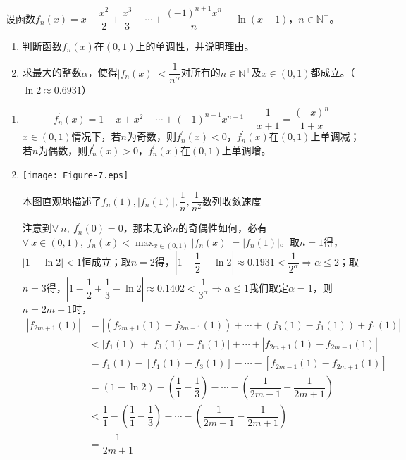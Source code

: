 \begin{que}
	设函数$f_n(x)=x-\dfrac{x^2}{2}+\dfrac{x^3}{3}-\cdots+\dfrac{(-1)^{n+1}x^n}{n}-\ln(x+1)$，$n\in\mathbb{N}^+$。
	\begin{enumerate}
		\item 判断函数$f_n(x)$在$(0,1)$上的单调性，并说明理由。
		\item 求最大的整数$\alpha$，使得$|f_n(x)|<\dfrac{1}{n^\alpha}$对所有的$n\in\mathbb{N}^+$及$x\in(0,1)$都成立。（$\ln 2\approx 0.6931$）
	\end{enumerate}
\end{que}
\sol{} \begin{enumerate}
	\item $$f_n^\prime(x)=1-x+x^2-\cdots+(-1)^{n-1}x^{n-1}-\dfrac{1}{x+1}=\dfrac{(-x)^n}{1+x}$$$x\in(0,1)$情况下，若$n$为奇数，则$f_n^\prime(x)<0$，$f_n^\prime(x)$在$(0,1)$上单调减；若$n$为偶数，则$f_n^\prime(x)>0$，$f_n^\prime(x)$在$(0,1)$上单调增。
	\item 	\begin{marginfigure}
		\texttt{[image: Figure-7.eps]}
		\caption{本图直观地描述了$f_n(1),|f_n(1)|,\dfrac{1}{n},\dfrac{1}{n^2}$数列收敛速度}
	\end{marginfigure}注意到$\forall\ n,\ f_n^\prime(0)=0$，那末无论$n$的奇偶性如何，必有$\displaystyle\forall\ x\in(0,1),\ f_n(x)<\max_{x\in(0,1)}|f_n(x)|=|f_n(1)|$。取$n=1$得，$|1-\ln 2|<1$恒成立；取$n=2$得，$\left|1-\dfrac{1}{2}-\ln 2\right|\approx0.1931<\dfrac{1}{2^\alpha}\Rightarrow \alpha\leqslant 2$；取$n=3$得，$\left|1-\dfrac{1}{2}+\dfrac{1}{3}-\ln 2\right|\approx0.1402<\dfrac{1}{3^\alpha}\Rightarrow \alpha\leqslant 1$我们取定$\alpha=1$，则$n=2m+1$时，$$\begin{aligned}|f_{2m+1}(1)|&=|(f_{2m+1}(1)-f_{2m-1}(1))+\cdots+(f_3(1)-f_1(1))+f_1(1)|\\&<|f_1(1)|+|f_3(1)-f_1(1)|+\cdots+|f_{2m+1}(1)-f_{2m-1}(1)|\\&=f_1(1)-[f_1(1)-f_3(1)]-\cdots-[f_{2m-1}(1)-f_{2m+1}(1)]\\&=\left(1-\ln 2\right)-\left(\dfrac{1}{1}-\dfrac{1}{3}\right)-\cdots-\left(\dfrac{1}{2m-1}-\dfrac{1}{2m+1}\right)\\&<\dfrac{1}{1}-\left(\dfrac{1}{1}-\dfrac{1}{3}\right)-\cdots-\left(\dfrac{1}{2m-1}-\dfrac{1}{2m+1}\right)\\&=\dfrac{1}{2m+1}\end{aligned}$$

\end{enumerate}
